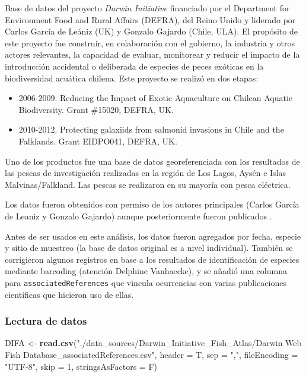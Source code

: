 \documentclass[sn-apa,pdflatex]{sn-jnl}
\newenvironment{Shaded}{\begin{snugshade}}{\end{snugshade}}
\newcommand{\AttributeTok}[1]{\textcolor[rgb]{0.13,0.29,0.53}{#1}}
\newcommand{\DecValTok}[1]{\textcolor[rgb]{0.00,0.00,0.81}{#1}}
\newcommand{\FunctionTok}[1]{\textcolor[rgb]{0.13,0.29,0.53}{\textbf{#1}}}
\newcommand{\NormalTok}[1]{#1}
\newcommand{\OtherTok}[1]{\textcolor[rgb]{0.56,0.35,0.01}{#1}}
\newcommand{\StringTok}[1]{\textcolor[rgb]{0.31,0.60,0.02}{#1}}
\providecommand{\tightlist}{%
  \setlength{\itemsep}{0pt}\setlength{\parskip}{0pt}}
\begin{document}
Base de datos del proyecto \emph{Darwin Initiative}
\citep{GarciadeLeaniz2012} financiado por el Department for Environment
Food and Rural Affairs (DEFRA), del Reino Unido y liderado por Carlos
García de Leániz (UK) y Gonzalo Gajardo (Chile, ULA). El propósito de
este proyecto fue construir, en colaboración con el gobierno, la
industria y otros actores relevantes, la capacidad de evaluar,
monitorear y reducir el impacto de la introducción accidental o
deliberada de especies de peces exóticas en la biodiversidad acuática
chilena. Este proyecto se realizó en dos etapas:

\begin{itemize}
\tightlist
\item
  2006-2009. Reducing the Impact of Exotic Aquaculture on Chilean
  Aquatic Biodiversity. Grant \#15020, DEFRA, UK.\\
\item
  2010-2012. Protecting galaxiids from salmonid invasions in Chile and
  the Falklands. Grant EIDPO041, DEFRA, UK.
\end{itemize}

Uno de los productos fue una base de datos georeferenciada con los
resultados de las pescas de investigación realizadas en la región de Los
Lagos, Aysén e Islas Malvinas/Falkland. Las pescas se realizaron en su
mayoría con pesca eléctrica.

Los datos fueron obtenidos con permiso de los autores principales
(Carlos García de Leaniz y Gonzalo Gajardo) aunque posteriormente fueron
publicados \citep{Leaniz2020}.

Antes de ser usados en este análisis, los datos fueron agregados por
fecha, especie y sitio de muestreo (la base de datos original es a nivel
individual). También se corrigieron algunos registros en base a los
resultados de identificación de especies mediante barcoding (atención
Delphine Vanhaecke), y se añadió una columna para
\texttt{associatedReferences} que vincula ocurrencias con varias
publicaciones científicas que hicieron uso de ellas.

\subsubsection{Lectura de datos}\label{lectura-de-datos-5}

\begin{Shaded}
\begin{Highlighting}[]
\NormalTok{DIFA }\OtherTok{\textless{}{-}} \FunctionTok{read.csv}\NormalTok{(}\StringTok{"./data\_sources/Darwin\_Initiative\_Fish\_Atlas/Darwin Web Fish Database\_associatedReferences.csv"}\NormalTok{,}
    \AttributeTok{header =}\NormalTok{ T, }\AttributeTok{sep =} \StringTok{","}\NormalTok{, }\AttributeTok{fileEncoding =} \StringTok{"UTF{-}8"}\NormalTok{, }\AttributeTok{skip =} \DecValTok{1}\NormalTok{,}
    \AttributeTok{stringsAsFactors =}\NormalTok{ F)}
\end{Highlighting}
\end{Shaded}
\end{document}
